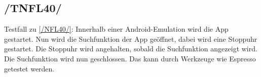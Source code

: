 \subsection*{/TNFL40/}

\label{/TNFL40/} Testfall zu \ref{/NFL40/}: Innerhalb einer \Gls{Android}-\Gls{Emulation} wird die App gestartet.
Nun wird die Suchfunktion der App geöffnet, dabei wird eine Stoppuhr gestartet.
Die Stoppuhr wird angehalten, sobald die Suchfunktion angezeigt wird.
Die Suchfunktion wird nun geschlossen.
Das kann durch Werkzeuge wie \Gls{Espresso} getestet werden.